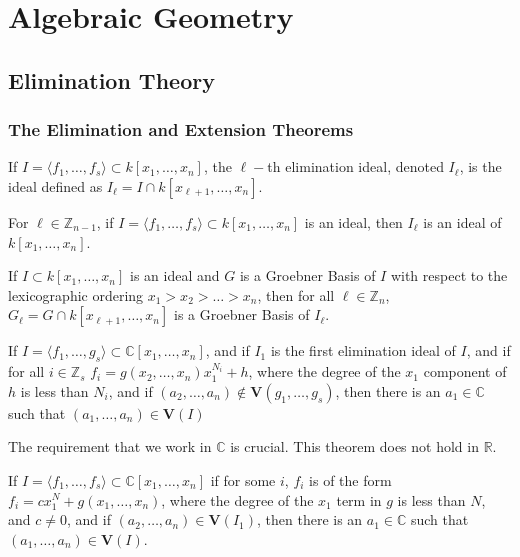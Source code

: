 \documentclass[crop=false,class=article,oneside]{standalone}
\begin{document}
    \ifx\ifmathcoursesalgebraicgeometry\undefined
        \section*{Algebraic Geometry}
        \setcounter{section}{1}
    \fi
    \subsection{Elimination Theory}
    \subsubsection{The Elimination and Extension Theorems}
    \begin{definition}
    If $I = \langle f_1,\hdots, f_s\rangle \subset k[x_1,\hdots ,x_n]$, the $\ell-$th elimination ideal, denoted $I_{\ell}$, is the ideal defined as $I_{\ell} = I \cap k[x_{\ell+1},\hdots, x_n]$.
    \end{definition}
    \begin{theorem}
    For $\ell \in \mathbb{Z}_{n-1}$, if $I = \langle f_1,\hdots, f_s\rangle\subset k[x_1,\hdots ,x_n]$ is an ideal, then $I_{\ell}$ is an ideal of $k[x_1,\hdots ,x_n]$.
    \end{theorem}
    \begin{theorem}
    If $I\subset k[x_1,\hdots ,x_n]$ is an ideal and $G$ is a Groebner Basis of $I$ with respect to the lexicographic ordering $x_1>x_2>\hdots > x_n$, then for all $\ell \in \mathbb{Z}_{n}$, $G_{\ell} = G\cap k[x_{\ell+1},\hdots, x_n]$ is a Groebner Basis of $I_{\ell}$.
    \end{theorem}
    \begin{theorem}
    If $I = \langle f_1,\hdots, g_s\rangle \subset \mathbb{C}[x_1,\hdots ,x_n]$, and if $I_1$ is the first elimination ideal of $I$, and if for all $i\in \mathbb{Z}_s$ $f_i = g(x_2,\hdots, x_n)x_1^{N_i}+h$, where the degree of the $x_1$ component of $h$ is less than $N_i$, and if $(a_2,\hdots, a_n)\notin \textbf{V}(g_1,\hdots, g_s)$, then there is an $a_1 \in \mathbb{C}$ such that $(a_1,\hdots, a_n)\in \textbf{V}(I)$
    \end{theorem}
    \begin{remark}
    The requirement that we work in $\mathbb{C}$ is crucial. This theorem does not hold in $\mathbb{R}$. 
    \end{remark}
    \begin{theorem}
    If $I = \langle f_1,\hdots, f_s\rangle \subset \mathbb{C}[x_1,\hdots, x_n]$ if for some $i$, $f_i$ is of the form $f_i = cx_1^N + g(x_1,\hdots, x_n)$, where the degree of the $x_1$ term in $g$ is less than $N$, and $c \ne 0$, and if $(a_2,\hdots, a_n) \in \textbf{V}(I_{1})$, then there is an $a_1 \in \mathbb{C}$ such that $(a_1,\hdots, a_n) \in \textbf{V}(I)$.
    \end{theorem}
\end{document}
